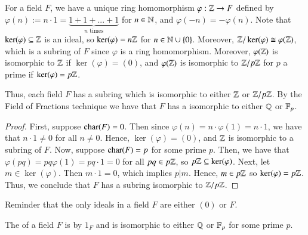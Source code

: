 \begin{remark}
    For a field $F$, we have a unique ring homomorphism $\varphi:\mathbb Z\rightarrow F$ defined by $\varphi(n) := n\cdot 1 = \underbrace{1+1+...+1}_{\text{$n$ times}}$ for $n \in \mathbb N$, and $\varphi(-n) = -\varphi(n)$. Note that $\ker(\varphi) \subseteq \mathbb Z$ is an ideal, so $\ker(\varphi) = n\mathbb Z$ for $n \in \mathbb N\cup \{0\}$. Moreover, $\mathbb Z/\ker(\varphi) \cong \varphi(\mathbb Z)$, which is a subring of $F$ since $\varphi$ is a ring homomorphism. Moreover, $\varphi(\mathbb Z)$ is isomorphic to $\mathbb Z$ if $\ker(\varphi) = (0)$, and $\varphi(\mathbb Z)$ is isomorphic to $\mathbb Z/p\mathbb Z$ for $p$ a prime if $\ker(\varphi) = p\mathbb Z$. 

    Thus, each field $F$ has a subring which is isomorphic to either $\mathbb Z$ or $\mathbb Z/p\mathbb Z$. By the Field of Fractions technique we have that $F$ has a  isomorphic to either $\mathbb Q$ or $\mathbb F_p$.
\end{remark}
\begin{proof}
    First, suppose $\operatorname{char}(F) = 0$. Then since $\varphi(n) = n\cdot \varphi(1) = n\cdot 1$, we have that $n\cdot 1 \neq 0$ for all $n \neq 0$. Hence, $\ker(\varphi) = (0)$, and $\mathbb Z$ is isomorphic to a subring of $F$. Now, suppose $\operatorname{char}(F) = p$ for some prime $p$. Then, we have that $\varphi(pq) = pq\varphi(1) = pq\cdot1 = 0$ for all $pq \in p\mathbb Z$, so $p\mathbb Z \subseteq \ker(\varphi)$. Next, let $m \in \ker(\varphi)$. Then $m\cdot 1 = 0$, which implies $p\vert m$. Hence, $m \in p\mathbb Z$ so $\ker(\varphi) = p\mathbb Z$. Thus, we conclude that $F$ has a subring isomorphic to $\mathbb Z/p\mathbb Z$.
\end{proof}


\begin{remark}
    Reminder that the only ideals in a field $F$ are either $(0)$ or $F$.
\end{remark}


\begin{definition}
    The  of a field $F$ is  by $1_F$ and is isomorphic to either $\mathbb Q$ or $\mathbb F_p$ for some prime $p$.
\end{definition}
